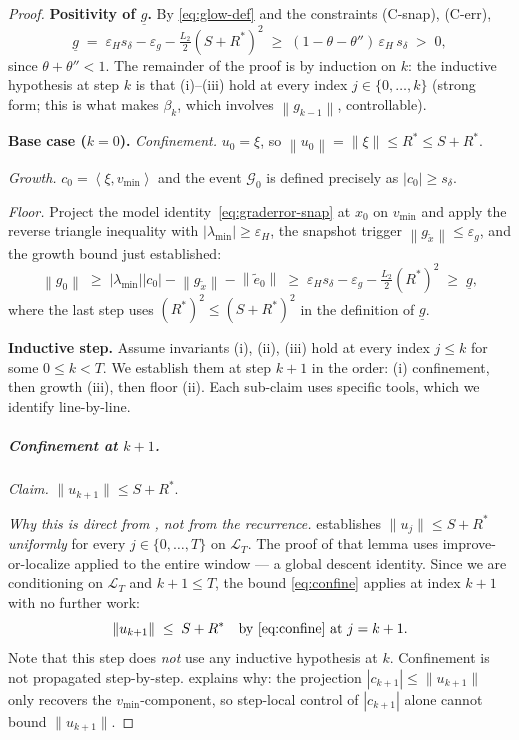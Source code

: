 \documentclass[11pt,a4paper]{article}
\theoremstyle{plain}
\theoremstyle{definition}
\newcommand{\norm}[1]{\left\|#1\right\|}
\newcommand{\inner}[2]{\left\langle #1,#2 \right\rangle}
\newcommand{\eps}{\varepsilon}
\newcommand{\epsg}{\eps_{g}}
\newcommand{\epsH}{\eps_{H}}
\newcommand{\Ltwo}{L_{2}}
\newcommand{\snap}{\tilde{x}}
\newcommand{\vmin}{v_{\min}}
\newcommand{\lmin}{\lambda_{\min}}
\newcommand{\sdel}{s_{\delta}}
\newcommand{\glow}{\underline{g}}
\newcommand{\proofpara}[1]{\par\medskip\noindent\textbf{#1}\quad}
\newcommand{\Rstar}{R^{*}}
\begin{document}
\begin{proof}
\proofpara{Positivity of $\glow$.}
By \eqref{eq:glow-def} and the constraints (C-snap), (C-err),
\[
\glow \;=\; \epsH\sdel - \epsg - \tfrac{\Ltwo}{2}(S+\Rstar)^2
\;\ge\; (1 - \theta - \theta'')\,\epsH\,\sdel \;>\; 0,
\]
since $\theta+\theta'' < 1$. The remainder of the proof is by induction on $k$:
the inductive hypothesis at step $k$ is that (i)--(iii) hold at every index
$j\in\{0,\dots,k\}$ (strong form; this is what makes $\beta_{k}$, which
involves $\norm{g_{k-1}}$, controllable).

\proofpara{Base case ($k=0$).}
\emph{Confinement.} $u_0 = \xi$, so $\norm{u_0} = \norm{\xi} \le \Rstar \le S+\Rstar$.

\emph{Growth.} $c_0 = \inner{\xi}{\vmin}$ and the event $\mathcal{G}_0$ is
defined precisely as $|c_0|\ge\sdel$.

\emph{Floor.} Project the model identity~\eqref{eq:graderror-snap} at $x_0$
on $\vmin$ and apply the reverse triangle inequality with $|\lmin|\ge\epsH$,
the snapshot trigger $\norm{g_{\snap}}\le\epsg$, and the growth bound just
established:
\[
\norm{g_0}
\;\ge\; |\lmin||c_0| - \norm{g_{\snap}} - \norm{\tilde e_0}
\;\ge\; \epsH\sdel - \epsg - \tfrac{\Ltwo}{2}(\Rstar)^2
\;\ge\; \glow,
\]
where the last step uses $(\Rstar)^2\le(S+\Rstar)^2$ in the definition of $\glow$.

\proofpara{Inductive step.}
Assume invariants (i), (ii), (iii) hold at every index $j \le k$ for some
$0 \le k < T$. We establish them at step $k+1$ in the order: (i) confinement,
then growth (iii), then floor (ii). Each sub-claim uses specific tools, which we
identify line-by-line.

\subparagraph{Confinement at $k+1$.}
\emph{Claim.} $\|u_{k+1}\| \le S + \Rstar$.

\emph{Why this is direct from , not from the recurrence.}
 establishes $\|u_j\| \le S + \Rstar$ \emph{uniformly}
for every $j \in \{0,\dots,T\}$ on $\mathcal{L}_T$. The proof of that lemma
uses improve-or-localize applied to the entire window --- a global descent
identity. Since we are conditioning on $\mathcal{L}_T$ and $k+1 \le T$,
the bound \eqref{eq:confine} applies at index $k+1$ with no further work:
\[
\|u_{k+1}\| \;\le\; S+\Rstar \quad\text{by \eqref{eq:confine} at }j=k+1.
\]
Note that this step does \emph{not} use any inductive hypothesis at $k$.
Confinement is not propagated step-by-step. 
explains why: the projection $|c_{k+1}| \le \|u_{k+1}\|$ only recovers the
$\vmin$-component, so step-local control of $|c_{k+1}|$ alone cannot
bound $\|u_{k+1}\|$.


\end{proof}
\end{document}

